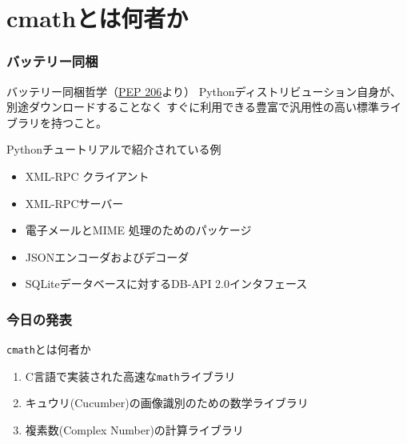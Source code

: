 \documentclass[dvipdfmx,11pt,notheorems]{beamer}
\theoremstyle{definition}
\begin{document}
\section{cmathとは何者か}

\begin{frame}\frametitle{バッテリー同梱}

\begin{block}{バッテリー同梱哲学（\href{https://www.python.org/dev/peps/pep-0206/}{PEP 206}より）}
Pythonディストリビューション自身が、別途ダウンロードすることなく
すぐに利用できる豊富で汎用性の高い標準ライブラリを持つこと。
\end{block}

\begin{exampleblock}{Pythonチュートリアルで紹介されている例}
\begin{itemize}
\item {} XML-RPC クライアント
\item {} XML-RPCサーバー
\item {} 電子メールとMIME 処理のためのパッケージ
\item {} JSONエンコーダおよびデコーダ
\item {} SQLiteデータベースに対するDB-API 2.0インタフェース
\end{itemize}
\end{exampleblock}

\end{frame}

\begin{frame}\frametitle{今日の発表}

\begin{exampleblock}{\texttt{cmath}とは何者か}
\begin{enumerate}
\item C言語で実装された高速な\texttt{math}ライブラリ
\item キュウリ(Cucumber)の画像識別のための数学ライブラリ
\item 複素数(Complex Number)の計算ライブラリ
\end{enumerate}

\end{exampleblock}

\end{frame}
\end{document}
